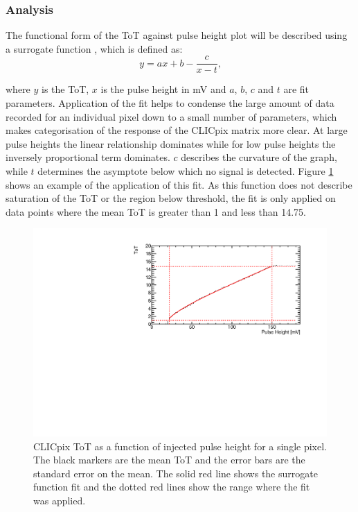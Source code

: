
\subsubsection{Analysis}
The functional form of the ToT against pulse height plot will be described using a surrogate function \cite{AlipourTehrani:2054922}, which is defined as:  
\begin{equation}
y  = ax + b  - \frac{c}{x-t} \text{,}
\end{equation}

\noindent where $y$ is the ToT, $x$ is the pulse height in mV and $a$, $b$, $c$ and $t$ are fit parameters.  Application of the fit helps to condense the large amount of data recorded for an individual pixel down to a small number of parameters, which makes categorisation of the response of the CLICpix matrix more clear.  At large pulse heights the linear relationship dominates while for low pulse heights the inversely proportional term dominates.  $c$ describes the curvature of the graph, while $t$ determines the asymptote below which no signal is detected.  Figure \ref{fig:testpulseexamplefit} shows an example of the application of this fit.  As this function does not describe saturation of the ToT or the region below threshold, the fit is only applied on data points where the mean ToT is greater than 1 and less than 14.75.  

\begin{figure}
\centering
\includegraphics[width=1.0\textwidth]{CLICdpVertex/Plots/TestPulseCalibration/Fits/Set9/ToT_PulseHeight_Set_9_ChipID_001ec0db94b1_Pixel_x0_y0_Fit.pdf}
\caption[CLICpix ToT as a function of injected pulse height.]{CLICpix ToT as a function of injected pulse height for a single pixel.  The black markers are the mean ToT and the error bars are the standard error on the mean.  The solid red line shows the surrogate function fit and the dotted red lines show the range where the fit was applied.}
\label{fig:testpulseexamplefit}
\end{figure}

